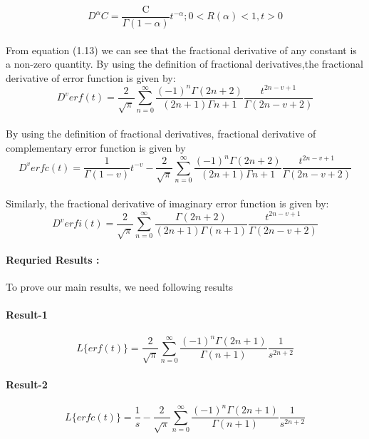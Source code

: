 \documentclass[leqno]{article}
\begin{document}
\begin{equation}
    D^{\alpha}C = 
    \frac{\text{C}}{\Gamma{(1-\alpha)}}
    t^{- \alpha};
    0 < R(\alpha) < 1,
    t > 0
\end{equation}\\ 
From equation (1.13) we can see that the fractional derivative of any constant is a non-zero quantity.
By using the definition of fractional derivatives,the fractional derivative of error function is given by:
\begin{equation}
    D^v erf(t) = 
    \frac{2}{\sqrt{\pi}}
    \sum_{n = 0}^{\infty}
    \frac{{(-1)}^n\Gamma{(2n+2)}}{(2n+1)\Gamma{n+1}}
    \frac{t^{2n-v+1}}{\Gamma{(2n-v+2)}}
\end{equation}\\ 
By using the definition of fractional derivatives, fractional derivative of complementary error function is given by\\ 
\begin{equation}
    D^v erfc(t) = 
    \frac{1}{\Gamma(1 - v)}
    t^{-v}-
    \frac{2}{\sqrt{\pi}}
    \sum_{n = 0}^{\infty}
    \frac{{(-1)}^n\Gamma{(2n+2)}}{(2n+1)\Gamma{n+1}}
    \frac{t^{2n-v+1}}{\Gamma{(2n-v+2)}}
\end{equation}
\\ 
Similarly, the fractional derivative of imaginary error function is given by:
\\ 
\begin{equation}
    D^v erfi(t) = 
    \frac{2}{\sqrt{\pi}}
    \sum_{n = 0}^{\infty}
    \frac{{\Gamma{(2n+2)}}}{(2n+1)\Gamma{(n+1)}}
    \frac{t^{2n-v+1}}{\Gamma{(2n-v+2)}}
\end{equation}
\paragraph{Requried Results :\\}
    To prove our main results, we need following results
\paragraph{Result-1}
\begin{equation}
    L \big\{ erf(t) \big\} = 
    \frac{2}{\sqrt{\pi}}
    \sum_{n = 0}^{\infty}
    \frac{{(-1)}^n\Gamma{(2n+1)}}{\Gamma{(n+1)}}
    \frac{1}{s^{2n+2}}
\end{equation}
\paragraph{Result-2}
\begin{equation}
    L \big\{ erfc(t) \big\} = 
    \frac{1}{s}-
    \frac{2}{\sqrt{\pi}}
    \sum_{n = 0}^{\infty}
    \frac{{(-1)}^n\Gamma{(2n+1)}}{\Gamma{(n+1)}}
    \frac{1}{s^{2n+2}}
\end{equation}
\end{document}
